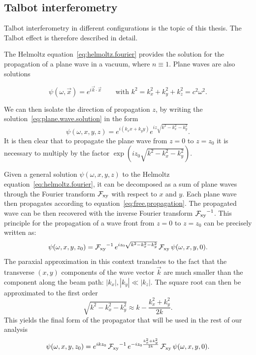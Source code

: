 \subsection{Talbot interferometry}\label{sec:talbot-interferometry}
Talbot interferometry in different configurations is the topic of this
thesis. The Talbot effect is therefore described in detail.

The Helmoltz equation~\eqref{eq:helmoltz.fourier} provides the solution for
the propagation of a plane wave in a vacuum, where $n \equiv 1$. Plane waves
are also solutions

\begin{equation}
    \psi(\omega, \vec{x}) = e^{i\vec{k}\cdot \vec{x}} \qquad \text{with } k^2
    = k_x^2 + k_y^2 + k_z^2 = c^2 \omega^2.
    \label{eq:plane.wave.solution}
\end{equation}

We can then isolate the direction
of propagation $z$, by writing the solution~\eqref{eq:plane.wave.solution} in the form
\begin{equation}
    \psi(\omega, x, y, z) = e^{i(k_x x + k_y y)}e^{iz\sqrt{k^2 - k_x^2 -
    k_y^2}}.
    \label{eq:free.propagation}
\end{equation}
It is then clear that to propagate the plane wave from $z = 0$ to $z = z_0$
it is necessary to multiply by the factor $\exp(iz_{0}\sqrt{k^2 - k_x^2 -
k_y^2})$.

Given a general solution $\psi(\omega, x, y, z)$ to the Helmoltz
equation~\eqref{eq:helmoltz.fourier}, it can be decomposed as a sum of plane
waves through the Fourier transform $\operatorname{\mathcal{F}_{xy}}$ with respect to $x$ and $y$. Each
plane wave then propagates according to
equation~\eqref{eq:free.propagation}. The propagated wave can be then
recovered with the inverse Fourier transform $\operatorname{\mathcal{F}_{xy}}^{-1}$.
This principle for the propagation of a wave front from $z=0$ to $z=z_0$ can
be precisely written as:
\begin{equation}
    \psi(\omega, x, y, z_0) = \operatorname{\mathcal{F}_{xy}}^{-1}e^{i z_0 \sqrt{k^2 - k_x^2 -
    k_y^2}}\operatorname{\mathcal{F}_{xy}}    \psi(\omega, x, y, 0).
    \label{eq:full.propagator}
\end{equation}
The paraxial approximation in this context translates to the fact that the
transverse $(x, y)$ components of the wave vector $\vec{k}$ are much smaller than the
component along the beam path: $|k_x|, |k_y| \ll |k_z|$. The square root can
then be approximated to the first order
\begin{equation}
    \sqrt{k^2 - k_x^2 - k_y^2} \approx k - \frac{k_x^2 + k_y^2}{2k}.
    \label{eq:square.root.approximation}
\end{equation}
This yields the final form of the propagator that will be used in the rest
of our analysis
\begin{equation}
    \psi(\omega, x, y, z_0) = e^{i k z_0}\operatorname{\mathcal{F}_{xy}}^{-1}e^{-i z_0\frac{k_x^2 +
    k_y^2}{2k}}\operatorname{\mathcal{F}_{xy}}\psi(\omega, x, y, 0). \label{eq:paraxial.propagator}
\end{equation}

